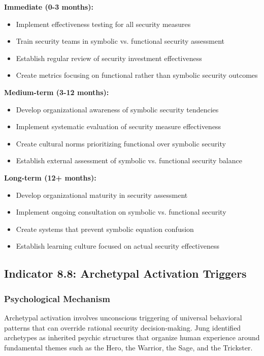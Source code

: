 \documentclass[11pt,a4paper]{article}
\begin{document}
\textbf{Immediate (0-3 months):}
\begin{itemize}
\item Implement effectiveness testing for all security measures
\item Train security teams in symbolic vs. functional security assessment
\item Establish regular review of security investment effectiveness
\item Create metrics focusing on functional rather than symbolic security outcomes
\end{itemize}

\textbf{Medium-term (3-12 months):}
\begin{itemize}
\item Develop organizational awareness of symbolic security tendencies
\item Implement systematic evaluation of security measure effectiveness
\item Create cultural norms prioritizing functional over symbolic security
\item Establish external assessment of symbolic vs. functional security balance
\end{itemize}

\textbf{Long-term (12+ months):}
\begin{itemize}
\item Develop organizational maturity in security assessment
\item Implement ongoing consultation on symbolic vs. functional security
\item Create systems that prevent symbolic equation confusion
\item Establish learning culture focused on actual security effectiveness
\end{itemize}

\subsection{Indicator 8.8: Archetypal Activation Triggers}

\subsubsection{Psychological Mechanism}

Archetypal activation involves unconscious triggering of universal behavioral patterns that can override rational security decision-making. Jung identified archetypes as inherited psychic structures that organize human experience around fundamental themes such as the Hero, the Warrior, the Sage, and the Trickster\cite{jung1969}.
\end{document}
